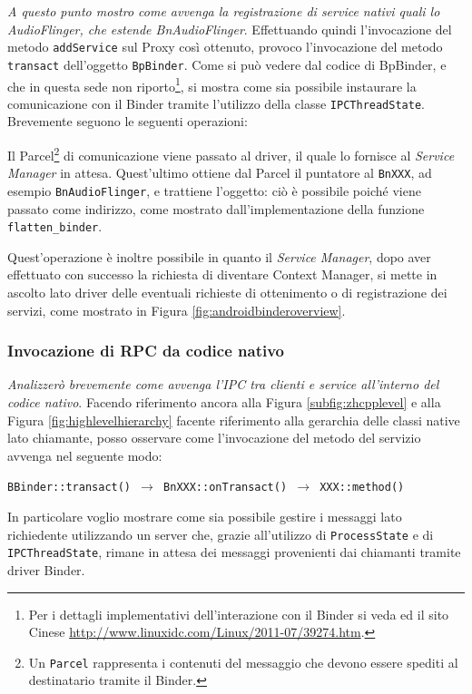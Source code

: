 \textit{A questo punto mostro come avvenga la registrazione di \textrm{service}
nativi quali lo AudioFlinger, che estende BnAudioFlinger}. Effettuando quindi
l'invocazione del metodo \texttt{\small addService} sul Proxy così ottenuto, 
provoco l'invocazione del metodo \texttt{\small transact} dell'oggetto
 \texttt{\small BpBinder}. Come si può vedere dal codice di BpBinder, e che
in questa sede non riporto\footnote{Per i dettagli implementativi dell'interazione
con il Binder si veda \parencite{site:anonBinder} ed il sito Cinese \url{http://www.linuxidc.com/Linux/2011-07/39274.htm}.},
si mostra come sia possibile instaurare la comunicazione con il Binder tramite
l'utilizzo della classe \texttt{\small IPCThreadState}. Brevemente seguono le 
seguenti operazioni:
\begin{itemize}
\diam Il Parcel\footnote{Un \texttt{\small Parcel} rappresenta i contenuti
	del messaggio che devono essere spediti al destinatario tramite il Binder.}
	di comunicazione viene passato al driver, il quale lo fornisce al
	\textit{Service Manager} in attesa.
\diam Quest'ultimo ottiene dal Parcel il puntatore al \texttt{\small BnXXX}, ad
	esempio \texttt{\small BnAudioFlinger}, e trattiene l'oggetto: ciò è possibile
	poiché viene passato come indirizzo, come mostrato dall'implementazione
	della funzione \texttt{\small flatten\_binder}.
\end{itemize}

Quest'operazione è inoltre possibile in quanto il \textit{Service Manager}, dopo 
aver effettuato con successo la richiesta di diventare Context Manager, si 
mette in ascolto lato driver delle eventuali richieste di ottenimento o di 
registrazione dei servizi, come mostrato in Figura 
\vref{fig:androidbinderoverview}.

\subsubsection{Invocazione di RPC da codice nativo}\label{subsub:evokrpcfromnative}
\textit{Analizzerò brevemente come avvenga l'IPC tra clienti e \textrm{service}
all'interno del codice nativo}. Facendo riferimento ancora alla Figura
\vref{subfig:zhcpplevel} e alla Figura  \vref{fig:highlevelhierarchy}
facente riferimento alla gerarchia delle classi native lato chiamante, 
posso osservare come l'invocazione del metodo del servizio avvenga nel seguente 
modo:
\begin{center}
\texttt{\small BBinder::transact() $\to$ BnXXX::onTransact() $\to$ XXX::method()}
\end{center}
In particolare voglio mostrare come sia possibile gestire i messaggi lato
richiedente utilizzando un server che, grazie all'utilizzo di \texttt{\small ProcessState}
e di \texttt{\small IPCThreadState}, rimane in attesa dei messaggi provenienti
dai chiamanti tramite driver Binder.



